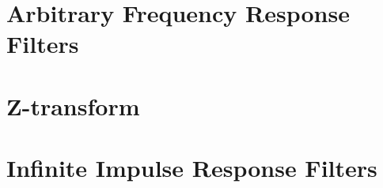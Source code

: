 \documentclass{tufte-book}
\begin{document}
\ifSpFiltering
\chapter{Arbitrary Frequency Response Filters}


 \ifSpExerciseSol
 
 \fi
\fi

\ifSpProgC

\fi

\ifSpZFIR
\chapter{Z-transform}


 \ifSpExerciseSol
 
 \fi
\fi

\ifSpZIIR
\chapter{Infinite Impulse Response Filters}


 \ifSpExerciseSol
 
 \fi
\fi

\backmatter
\printindex
\end{document}
